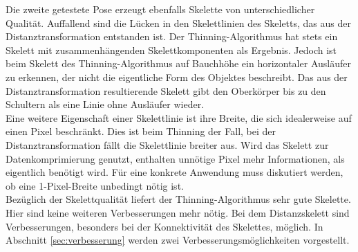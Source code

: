 Die zweite getestete Pose erzeugt ebenfalls Skelette von unterschiedlicher Qualität. Auffallend sind die Lücken in den Skelettlinien des Skeletts, das aus der Distanztransformation entstanden 
ist. Der Thinning-Algorithmus hat stets ein Skelett mit zusammenhängenden Skelettkomponenten als Ergebnis. 
Jedoch ist beim Skelett des Thinning-Algorithmus auf Bauchhöhe ein horizontaler Ausläufer zu erkennen, der nicht die eigentliche Form
des Objektes beschreibt. Das aus der Distanztransformation resultierende Skelett gibt den Oberkörper bis
zu den Schultern als eine Linie ohne Ausläufer wieder.\\
Eine weitere Eigenschaft einer Skelettlinie ist ihre Breite, die sich idealerweise auf einen Pixel beschränkt. Dies ist beim Thinning der Fall, bei der Distanztransformation fällt die Skelettlinie breiter
aus. Wird das Skelett zur Datenkomprimierung genutzt, enthalten unnötige Pixel mehr Informationen, als 
eigentlich benötigt wird. Für eine konkrete Anwendung muss diskutiert werden, ob eine 1-Pixel-Breite unbedingt nötig ist.\\
Bezüglich der Skelettqualität liefert der Thinning-Algorithmus sehr
gute Skelette. Hier sind keine weiteren Verbesserungen mehr nötig.
Bei dem Distanzskelett sind Verbesserungen, besonders bei der 
Konnektivität des Skelettes, möglich. In Abschnitt \ref{sec:verbesserung} werden zwei Verbesserungsmöglichkeiten vorgestellt.
